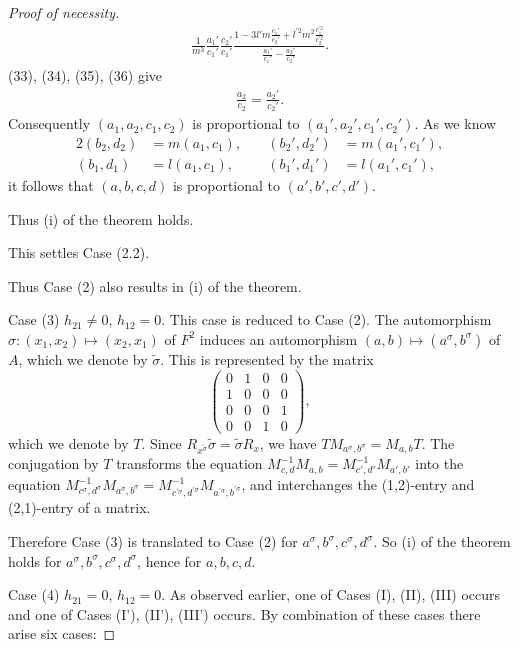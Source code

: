 \documentclass{article}
\begin{document}
\begin{proof}[Proof of necessity]
\begin{align*}
\frac{1}{m^3}\frac{a_1'}{c_1'}\frac{c_2'}{c_1'}\frac{1-3l'm\frac{c_1'}{c_2'}+l^{\prime2}m^2\frac{c_1^{\prime2}}{c_2^{\prime2}}}{\frac{a_1'}{c_1'}-\frac{a_2'}{c_2'}}.
\tag{36}
\end{align*}
(33), (34), (35), (36) give
\begin{align*}
\frac{a_2}{c_2}=\frac{a_2'}{c_2'}.
\end{align*}
Consequently $(a_1,a_2,c_1,c_2)$ is proportional to $(a_1',a_2',c_1',c_2')$.
As we know
\begin{alignat*}{2}
(b_2,d_2)&=m(a_1,c_1), \quad&(b_2',d_2')&=m(a_1',c_1'),\\
(b_1,d_1)&=l(a_1,c_1), & (b_1',d_1')&=l(a_1',c_1'),
\end{alignat*}
it follows that
$(a,b,c,d)$ is proportional to $(a',b',c',d')$.

Thus (i) of the theorem holds.

This settles Case (2.2).

Thus Case (2) also results in (i) of the theorem.

\medskip
Case (3) $h_{21}\ne 0$, $h_{12}=0$. This case is reduced to Case (2).
The automorphism $\sigma\colon(x_1,x_2)\mapsto (x_2,x_1)$ of $F^2$ induces an automorphism $(a,b)\mapsto (a^{\sigma}, b^{\sigma})$ of $A$, which we denote by 
$\tilde\sigma$.
This is represented by the matrix
$$
\begin{pmatrix}
0 & 1 & 0 & 0\\
1 & 0 & 0 & 0\\
0 & 0 & 0 & 1\\
0 & 0 & 1 & 0
\end{pmatrix},
$$
which we denote by $T$.
Since $R_{x^{\tilde\sigma}}\tilde\sigma=\tilde\sigma R_{x}$, we have
$T M_{a^{\sigma}, b^{\sigma}}=M_{a,b} T$.
The conjugation by $T$ transforms the equation $M_{c,d}^{-1}M_{a,b}=M_{c',d'}^{-1}M_{a',b'}$ into the equation
$M_{c^{\sigma},d^{\sigma}}^{-1}M_{a^{\sigma},b^{\sigma}}=M_{c^{\prime\sigma},d^{\prime\sigma}}^{-1}M_{a^{\prime\sigma},b^{\prime\sigma}}$, 
and  interchanges the (1,2)-entry and (2,1)-entry of a matrix.

Therefore Case (3) is translated to Case (2) for $a^{\sigma}, b^{\sigma}, c^{\sigma}, d^{\sigma}$.
So (i) of the theorem holds for $a^{\sigma}, b^{\sigma}, c^{\sigma}, d^{\sigma}$, hence for
$a,b,c,d$.

\medskip
Case (4) $h_{21}=0$, $h_{12}=0$.
As observed earlier, one of Cases (I), (II), (III) occurs
and  one of Cases (I'), (II'), (III') occurs.
 By combination of these cases 
there arise six cases:


\end{proof}
\end{document}
